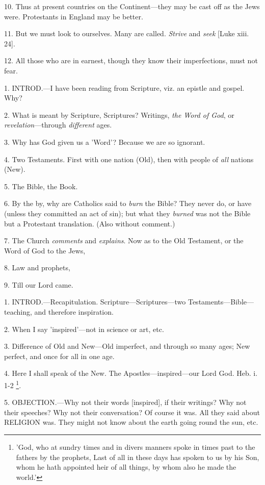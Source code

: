 10. Thus at present countries on the
Continent—they may be cast off as the Jews were. Protestants in
England may be better.

11. But we must look to ourselves. Many are
called. \emph{Strive} and \emph{seek} [Luke xiii. 24].

12. All those who are in earnest, though they
know their imperfections, must not fear.


1. INTROD.—I
have been reading from Scripture, viz. an epistle and gospel. Why?

2. What is meant by Scripture, Scriptures?
Writings, \emph{the Word of God}, or \emph{revelation}—through \emph{different}
ages.

3. Why has God given us a 'Word'? Because we are
so ignorant.

4. Two Testaments. First with one nation (Old),
then with people of \emph{all} nations (New).

5. The Bible, the Book.

6. By the by, why are Catholics said to \emph{burn}
the Bible? They never do, or have (unless they committed an act of
sin); but what they \emph{burned} was not the Bible but a Protestant
translation. (Also without comment.)

7. The Church \emph{comments} and \emph{explains}.
Now as to the Old Testament, or the Word of God to the Jews,

8. Law and prophets,

9. Till our Lord came.


1. INTROD.—Recapitulation.
Scripture—Scriptures—two Testaments—Bible—teaching, and
therefore inspiration.

2. When I say 'inspired'—not in science or art,
etc.

3. Difference of Old and New—Old imperfect, and
through so many ages; New perfect, and once for all in one age.

4. Here I shall speak of the New. The
Apostles—inspired—our Lord God. Heb. i. 1-2 \footnote{'God, who at sundry
times and in divers manners spoke in times past to the fathers by the
prophets, Last of all in these days has spoken to us by his Son, whom
he hath appointed heir of all things, by whom also he made the world.'}.

5. OBJECTION.—Why
not their words [inspired], if their writings? Why not their speeches?
Why not their conversation? Of course it was. All they said about RELIGION
was. They might not know about the earth going round the sun, etc.

